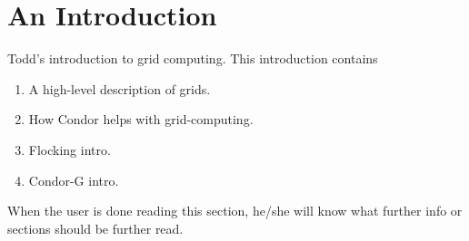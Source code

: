\section{\label{sec:grids-intro}An Introduction}

Todd's introduction to grid computing.
This introduction contains 
\begin{enumerate}
\item A high-level description of grids.
\item How Condor helps with grid-computing.
\item Flocking intro.
\item Condor-G intro.
\end{enumerate}

When the user is done reading this section, he/she will know
what further info or sections should be further read.
